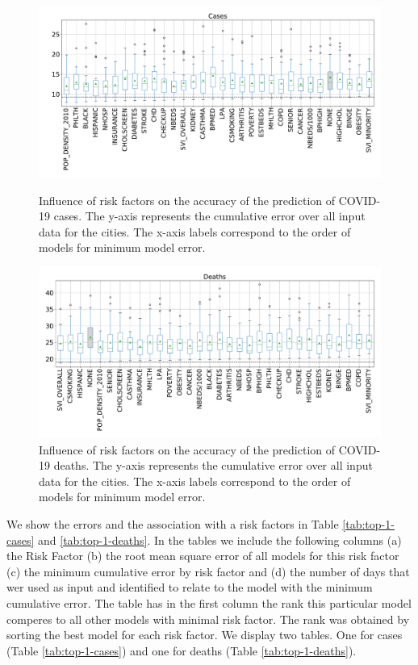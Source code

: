 \documentclass[a4paper, inpress]{jds} %
\renewcommand{\_}{%
    \textunderscore\hspace{0pt}%
}
\begin{document}
\begin{figure}[!p]
    \centering
    \includegraphics[width=1.0\textwidth]{images/boxplot_casesNEW2.pdf}
    \vspace{-1cm}
    \caption{Influence of risk factors on the accuracy of the
      prediction of COVID-19 cases. The y-axis represents the
      cumulative error over all input data for the cities. The x-axis labels correspond to the order of models for minimum model error.}
    \label{fig:box-cases}
    \bigskip

    \includegraphics[width=1.0\textwidth]{images/boxplot_deathNEW2.pdf}
    \vspace{-1cm}
    \caption{Influence of risk factors on the accuracy of the
      prediction of COVID-19 deaths. The y-axis represents the
      cumulative error over all input data for the cities. The x-axis labels correspond to the order of models for minimum model error.}
    \label{fig:box-death}
\end{figure}


We show the errors and the association with a risk factors in Table
\ref{tab:top-1-cases} and \ref{tab:top-1-deaths}. In the tables we
include the following columns (a) the Risk Factor (b) the root mean
square error of all models for this risk factor (c) the minimum
cumulative error by risk factor and (d) the number of days that wer
used as input and identified to relate to the model with the minimum
cumulative error. The table has in the first column the rank this
particular model comperes to all other models with minimal risk
factor.  The rank was obtained by sorting the best model for each risk
factor.  We display two tables. One for cases (Table
\ref{tab:top-1-cases}) and one for deaths (Table
\ref{tab:top-1-deaths}).
\end{document}
